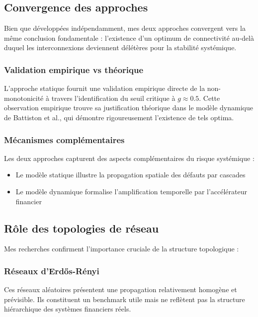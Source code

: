 \documentclass[12pt,a4paper,twoside]{article}
\begin{document}
\subsection{Convergence des approches}

Bien que développées indépendamment, mes deux approches convergent vers la même conclusion fondamentale : l'existence d'un optimum de connectivité au-delà duquel les interconnexions deviennent délétères pour la stabilité systémique.

\subsubsection{Validation empirique vs théorique}

L'approche statique fournit une validation empirique directe de la non-monotonicité à travers l'identification du seuil critique à $g \approx 0.5$. Cette observation empirique trouve sa justification théorique dans le modèle dynamique de Battiston et al., qui démontre rigoureusement l'existence de tels optima.

\subsubsection{Mécanismes complémentaires}

Les deux approches capturent des aspects complémentaires du risque systémique :
\begin{itemize}
\item Le modèle statique illustre la propagation spatiale des défauts par cascades
\item Le modèle dynamique formalise l'amplification temporelle par l'accélérateur financier
\end{itemize}

\subsection{Rôle des topologies de réseau}

Mes recherches confirment l'importance cruciale de la structure topologique :

\subsubsection{Réseaux d'Erdős-Rényi}

Ces réseaux aléatoires présentent une propagation relativement homogène et prévisible. Ils constituent un benchmark utile mais ne reflètent pas la structure hiérarchique des systèmes financiers réels.
\end{document}
